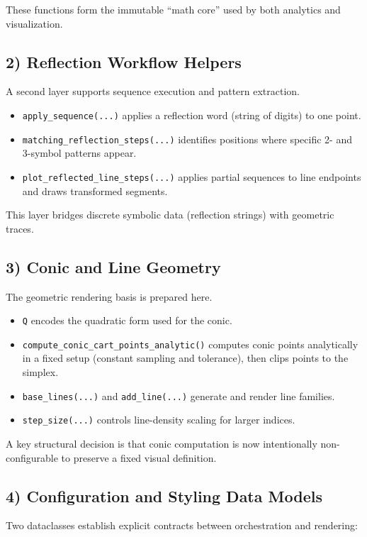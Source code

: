 \documentclass[11pt,a4paper]{article}
\begin{document}
These functions form the immutable ``math core'' used by both analytics and visualization.

\subsection*{2) Reflection Workflow Helpers}
A second layer supports sequence execution and pattern extraction.

\begin{itemize}
    \item \texttt{apply\_sequence(...)} applies a reflection word (string of digits) to one point.
    \item \texttt{matching\_reflection\_steps(...)} identifies positions where specific 2- and 3-symbol patterns appear.
    \item \texttt{plot\_reflected\_line\_steps(...)} applies partial sequences to line endpoints and draws transformed segments.
\end{itemize}

This layer bridges discrete symbolic data (reflection strings) with geometric traces.

\subsection*{3) Conic and Line Geometry}
The geometric rendering basis is prepared here.

\begin{itemize}
    \item \texttt{Q} encodes the quadratic form used for the conic.
    \item \texttt{compute\_conic\_cart\_points\_analytic()} computes conic points analytically in a fixed setup (constant sampling and tolerance), then clips points to the simplex.
    \item \texttt{base\_lines(...)} and \texttt{add\_line(...)} generate and render line families.
    \item \texttt{step\_size(...)} controls line-density scaling for larger indices.
\end{itemize}

A key structural decision is that conic computation is now intentionally non-configurable to preserve a fixed visual definition.

\subsection*{4) Configuration and Styling Data Models}
Two dataclasses establish explicit contracts between orchestration and rendering:
\end{document}
